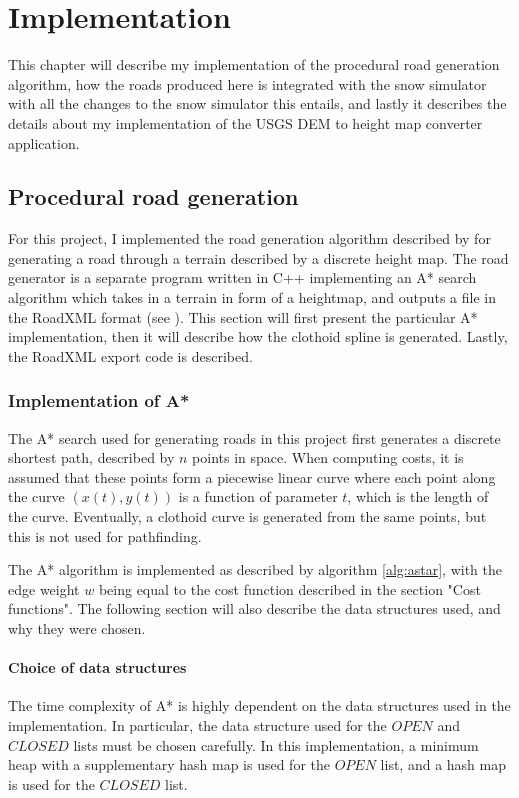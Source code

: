 \chapter{Implementation}
\label{chap:implementation}
This chapter will describe my implementation of the procedural road generation algorithm, how the roads produced here is integrated with the snow simulator with all the changes to the snow simulator this entails, and lastly it describes the details about my implementation of the USGS DEM to height map converter application.

\section{Procedural road generation}
\label{sec:impl_procroad}
For this project, I implemented the road generation algorithm described by \cite{roadgen} for generating a road through a terrain described by a discrete height map. The road generator is a separate program written in C++ implementing an A* search algorithm which takes in a terrain in form of a heightmap, and outputs a file in the RoadXML format (see \cite{roadxml}). This section will first present the particular A* implementation, then it will describe how the clothoid spline is generated. Lastly, the RoadXML export code is described. 

\subsection{Implementation of A*}
\label{sec:impl_astar}
The A* search used for generating roads in this project first generates a discrete shortest path, described by $n$ points in space. When computing costs, it is assumed that these points form a piecewise linear curve where each point along the curve $(x(t), y(t))$ is a function of parameter $t$, which is the length of the curve. Eventually, a clothoid curve is generated from the same points, but this is not used for pathfinding.

The A* algorithm is implemented as described by algorithm \ref{alg:astar}, with the edge weight $w$ being equal to the cost function described in the section "Cost functions". The following section will also describe the data structures used, and why they were chosen. 

\subsubsection{Choice of data structures}
The time complexity of A* is highly dependent on the data structures used in the implementation. In particular, the data structure used for the $OPEN$ and $CLOSED$ lists must be chosen carefully. In this implementation, a minimum heap with a supplementary hash map is used for the $OPEN$ list, and a hash map is used for the $CLOSED$ list.

